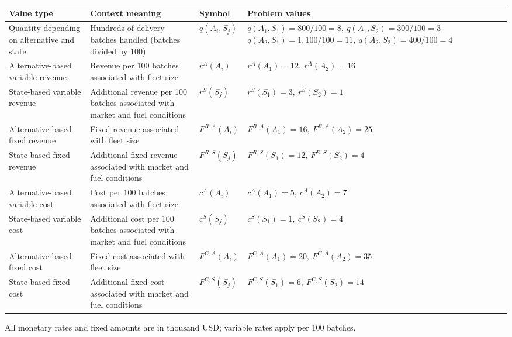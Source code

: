 {	\begin{center}
	\small
	\begin{tabularx}{\textwidth}{@{}>{\raggedright\arraybackslash}p{}>{\raggedright\arraybackslash}p{}>{\raggedright\arraybackslash}p{}>{\raggedright\arraybackslash}X@{}}
	\toprule
	Value type & Context meaning & Symbol & Problem values \\
	\midrule
	Quantity depending on alternative and state
	& Hundreds of delivery batches handled (batches divided by 100)
	& \(q(A_i,S_j)\)
	& \(q(A_1,S_1)=800/100=8,\ q(A_1,S_2)=300/100=3\)\newline
	  \(q(A_2,S_1)=1{,}100/100=11,\ q(A_2,S_2)=400/100=4\) \\
	Alternative-based variable revenue
	& Revenue per 100 batches associated with fleet size
	& \(r^A(A_i)\)
	& \(r^A(A_1)=12,\ r^A(A_2)=16\) \\
	State-based variable revenue
	& Additional revenue per 100 batches associated with market and fuel conditions
	& \(r^S(S_j)\)
	& \(r^S(S_1)=3,\ r^S(S_2)=1\) \\
	Alternative-based fixed revenue
	& Fixed revenue associated with fleet size
	& \(F^{R,A}(A_i)\)
	& \(F^{R,A}(A_1)=16,\ F^{R,A}(A_2)=25\) \\
	State-based fixed revenue
	& Additional fixed revenue associated with market and fuel conditions
	& \(F^{R,S}(S_j)\)
	& \(F^{R,S}(S_1)=12,\ F^{R,S}(S_2)=4\) \\
	Alternative-based variable cost
	& Cost per 100 batches associated with fleet size
	& \(c^A(A_i)\)
	& \(c^A(A_1)=5,\ c^A(A_2)=7\) \\
	State-based variable cost
	& Additional cost per 100 batches associated with market and fuel conditions
	& \(c^S(S_j)\)
	& \(c^S(S_1)=1,\ c^S(S_2)=4\) \\
	Alternative-based fixed cost
	& Fixed cost associated with fleet size
	& \(F^{C,A}(A_i)\)
	& \(F^{C,A}(A_1)=20,\ F^{C,A}(A_2)=35\) \\
	State-based fixed cost
	& Additional fixed cost associated with market and fuel conditions
	& \(F^{C,S}(S_j)\)
	& \(F^{C,S}(S_1)=6,\ F^{C,S}(S_2)=14\) \\
	\bottomrule
	\end{tabularx}
	\end{center}

	All monetary rates and fixed amounts are in thousand USD; variable rates apply per 100 batches.

	\vspace{-3mm}

}
